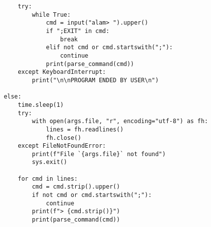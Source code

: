 \begin{verbatim}
        try:
            while True:
                cmd = input("alam> ").upper()
                if ";EXIT" in cmd:
                    break
                elif not cmd or cmd.startswith(";"):
                    continue
                print(parse_command(cmd))
        except KeyboardInterrupt:
            print("\n\nPROGRAM ENDED BY USER\n")

    else:
        time.sleep(1)
        try:
            with open(args.file, "r", encoding="utf-8") as fh:
                lines = fh.readlines()
                fh.close()
        except FileNotFoundError:
            print(f"File `{args.file}` not found")
            sys.exit()

        for cmd in lines:
            cmd = cmd.strip().upper()
            if not cmd or cmd.startswith(";"):
                continue
            print(f"> {cmd.strip()}")
            print(parse_command(cmd))
\end{verbatim}